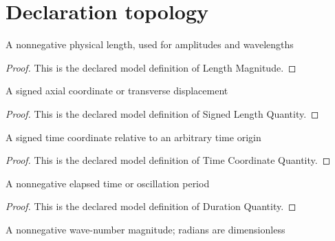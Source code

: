 \section{Declaration topology}
\begin{definition}
  \label{def:physics:phyx-mini-0297:phyxminiproblems-problemphyxmini0297-lengthmagnitude}
  A nonnegative physical length, used for amplitudes and wavelengths
\end{definition}
\begin{proof}
  This is the declared model definition of Length Magnitude.
\end{proof}
\begin{definition}
  \label{def:physics:phyx-mini-0297:phyxminiproblems-problemphyxmini0297-signedlengthquantity}
  A signed axial coordinate or transverse displacement
\end{definition}
\begin{proof}
  This is the declared model definition of Signed Length Quantity.
\end{proof}
\begin{definition}
  \label{def:physics:phyx-mini-0297:phyxminiproblems-problemphyxmini0297-timecoordinatequantity}
  A signed time coordinate relative to an arbitrary time origin
\end{definition}
\begin{proof}
  This is the declared model definition of Time Coordinate Quantity.
\end{proof}
\begin{definition}
  \label{def:physics:phyx-mini-0297:phyxminiproblems-problemphyxmini0297-durationquantity}
  A nonnegative elapsed time or oscillation period
\end{definition}
\begin{proof}
  This is the declared model definition of Duration Quantity.
\end{proof}
\begin{definition}
  \label{def:physics:phyx-mini-0297:phyxminiproblems-problemphyxmini0297-wavenumbermagnitude}
  A nonnegative wave-number magnitude; radians are dimensionless
\end{definition}
